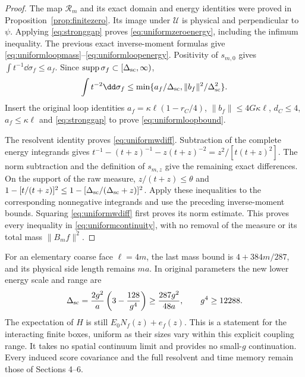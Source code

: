 \begin{proof}
The map $\mathcal R_m$ and its exact domain and energy identities
were proved in Proposition~\ref{prop:finitezero}. Its image under
$\mathcal U$ is physical and perpendicular to $\psi$. Applying
\eqref{eq:stronggap} proves \eqref{eq:uniformzeroenergy}, including
the infimum inequality. The previous exact inverse-moment formulas
give \eqref{eq:uniformloopmass}--\eqref{eq:uniformloopenergy}.
Positivity of $s_{m,0}$ gives
$\int t^{-1}\dd\sigma_f\leq a_f$. Since
$\operatorname{supp}\sigma_f\subset[\Delta_{\rm sc},\infty)$,
\[
 \int t^{-2}\dd\sigma_f\leq
 \min\{a_f/\Delta_{\rm sc},\|b_f\|^2/\Delta_{\rm sc}^2\}.
\]
Insert the original loop identities $a_f=\kappa\ell(1-r_C/4)$,
$\|b_f\|\leq4G\kappa\ell$, $d_C\leq4$, $a_f\leq\kappa\ell$
and \eqref{eq:stronggap} to prove \eqref{eq:uniformloopbound}.

The resolvent identity proves \eqref{eq:uniformwdiff}. Subtraction
of the complete energy integrands gives
$t^{-1}-(t+z)^{-1}-z(t+z)^{-2}=z^2/[t(t+z)^2]$.
The norm subtraction and the definition of $s_{m,z}$ give the
remaining exact differences. On the support of the raw measure,
$z/(t+z)\leq\theta$ and
$1-[t/(t+z)]^2\leq1-[\Delta_{\rm sc}/(\Delta_{\rm sc}+z)]^2$.
Apply these inequalities to the corresponding nonnegative
integrands and use the preceding inverse-moment bounds. Squaring
\eqref{eq:uniformwdiff} first proves its norm estimate. This proves
every inequality in \eqref{eq:uniformcontinuity}, with no removal
of the measure or its total mass $\|B_mf\|^2$.
\end{proof}

For an elementary coarse face $\ell=4m$, the last mass bound is
$4+384m/287$, and its physical side length remains $ma$.
In original parameters the new lower energy scale and range are
\[
 \Delta_{\rm sc}=\frac{2g^2}{a}\left(3-\frac{128}{g^4}\right)
 \geq\frac{287g^2}{48a},\qquad g^4\geq12288.
\]
The expectation of $H$ is still $E_0N_f(z)+e_f(z)$.
This is a statement for the interacting finite boxes, uniform as
their sizes vary within this explicit coupling range. It takes no
spatial continuum limit and provides no small-$g$ continuation.
Every induced score covariance and the full resolvent and time memory
remain those of Sections 4--6.
